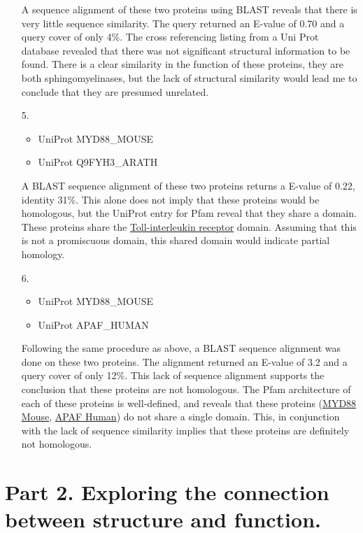 \documentclass[11pt]{article}
\begin{document}
\begin{itemize}
  A sequence alignment of these two proteins using BLAST reveals that there
  is very little sequence similarity. The query returned an E-value of 0.70
  and a query cover of only 4\%. The cross referencing listing from a Uni Prot
  database revealed that there was not significant structural information to be
  found. There is a clear similarity in the function of these proteins, they
  are both sphingomyelinases, but the lack of structural similarity would
  lead me to conclude that they are presumed unrelated.

\item[5.]
  \begin{itemize}
  \item UniProt MYD88\_MOUSE
  \item UniProt Q9FYH3\_ARATH
  \end{itemize}

  A BLAST sequence alignment of these two proteins returns a E-value of 0.22,
  identity 31\%. This alone does not imply that these proteins would be homologous,
  but the UniProt entry for Pfam reveal that they share a domain. These proteins
  share the \href{http://pfam.sanger.ac.uk/family/PF01582}{Toll-interleukin receptor}
  domain. Assuming that this is not a promiscuous domain, this shared domain would 
  indicate partial homology. 

\item[6.]
  \begin{itemize}
  \item UniProt MYD88\_MOUSE 
  \item UniProt APAF\_HUMAN
  \end{itemize}

  Following the same procedure as above, a BLAST sequence alignment was done on these
  two proteins. The alignment returned an E-value of 3.2 and a query cover of only 12\%.
  This lack of sequence alignment supports the conclusion that these proteins are 
  not homologous. The Pfam architecture of each of these proteins is well-defined, 
  and reveals that these proteins (\href{http://pfam.sanger.ac.uk/protein/P22366}{MYD88 Mouse}, 
  \href{http://pfam.sanger.ac.uk/protein/O14727}{APAF Human})
  do not share a single domain. This, in conjunction with the lack of sequence similarity
  implies that these proteins are definitely not homologous.

\end{itemize}

\section*{Part 2. Exploring the connection between structure and function.}
\end{document}

